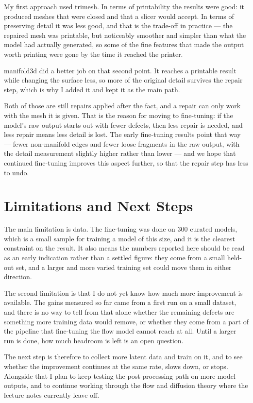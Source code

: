 \documentclass[11pt,a4paper]{article}
\begin{document}
My first approach used trimesh. In terms of printability the results were good: it produced meshes that were closed and that a slicer would accept. In terms of preserving detail it was less good, and that is the trade-off in practice --- the repaired mesh was printable, but noticeably smoother and simpler than what the model had actually generated, so some of the fine features that made the output worth printing were gone by the time it reached the printer.

manifold3d did a better job on that second point. It reaches a printable result while changing the surface less, so more of the original detail survives the repair step, which is why I added it and kept it as the main path.

Both of those are still repairs applied after the fact, and a repair can only work with the mesh it is given. That is the reason for moving to fine-tuning: if the model's raw output starts out with fewer defects, then less repair is needed, and less repair means less detail is lost. The early fine-tuning results point that way --- fewer non-manifold edges and fewer loose fragments in the raw output, with the detail measurement slightly higher rather than lower --- and we hope that continued fine-tuning improves this aspect further, so that the repair step has less to undo.


\section{Limitations and Next Steps}
The main limitation is data. The fine-tuning was done on 300 curated models, which is a small sample for training a model of this size, and it is the clearest constraint on the result. It also means the numbers reported here should be read as an early indication rather than a settled figure: they come from a small held-out set, and a larger and more varied training set could move them in either direction.

The second limitation is that I do not yet know how much more improvement is available. The gains measured so far came from a first run on a small dataset, and there is no way to tell from that alone whether the remaining defects are something more training data would remove, or whether they come from a part of the pipeline that fine-tuning the flow model cannot reach at all. Until a larger run is done, how much headroom is left is an open question.

The next step is therefore to collect more latent data and train on it, and to see whether the improvement continues at the same rate, slows down, or stops. Alongside that I plan to keep testing the post-processing path on more model outputs, and to continue working through the flow and diffusion theory where the lecture notes currently leave off.
\end{document}
